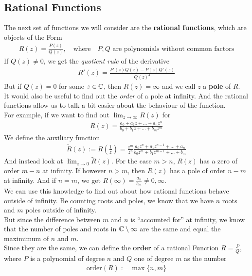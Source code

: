 \subsection{Rational Functions}
The next set of functions we will consider are the \textbf{rational functions}, which are objects of the Form 
\begin{align*}
				R(z) = \frac{P(z)}{Q(z)}, \quad \text{where} \quad P,Q \text{ are polynomials without common factors}
\end{align*}
If $Q(z) \neq 0$, we get the \emph{quotient rule} of the derivative
\begin{align*}
				R'(z) = \frac{P'(z)Q(z) - P(z)Q'(z)}{Q(z)^2}
\end{align*}
But if $Q(z) = 0$ for some $z \in \mathbb{C}$, then $R(z) = \infty$ and we call $z$ a \textbf{pole} of $R$.\\
It would also be useful to find out the \emph{order} of a pole at infinity. And the rational functions allow us to talk a bit easier about the behaviour of the function.\\
For example, if we want to find out $\lim_{z \to \infty} R(z)$ for
\begin{align*}
				R(z) = \frac{a_0 + a_1 z + \ldots + a_nz^n}{b_0 + b_1 z + \ldots + b_mz^m}
\end{align*}
We define the auxiliary function 
\begin{align*}
				\tilde{R}(z) := R(\frac{1}{z}) = \frac{z^m}{z^n} \frac{a_0z^n + a_1z^{n-1} + \ldots + a_n}{b_0z^{m} + b_1 z^{m-1} + \ldots + b_m}
\end{align*}
And instead look at $\lim_{z \to 0} \tilde{R}(z)$. For the case $m > n$, $R(z)$ has a zero of order $m-n$ at infinity. If however $n > m$, then $R(z)$ has a pole	of order $n-m$ at infinity. And if $n = m$, we get $R(\infty) = \frac{a_n}{b_m} \neq 0,\infty$.\\
We can use this knowledge to find out about how rational functions behave outside of infinity. Be counting roots and poles, we know that we have $n$ roots and $m$ poles outside of infinity.\\
But since the difference between $m$ and $n$ is ``accounted for'' at infinity, we know that the number of poles and roots in $\mathbb{C} \setminus \infty$ are the same and equal the maximimum of $n$ and $m$.\\
Since they are the same, we can define the \textbf{order} of a rational Function $R = \frac{P}{Q}$, where $P$ is a polynomial of degree $n$ and $Q$ one of degree $m$ as the number
\begin{align*}
				\text{order}(R) := \max\{n,m\}
\end{align*}

